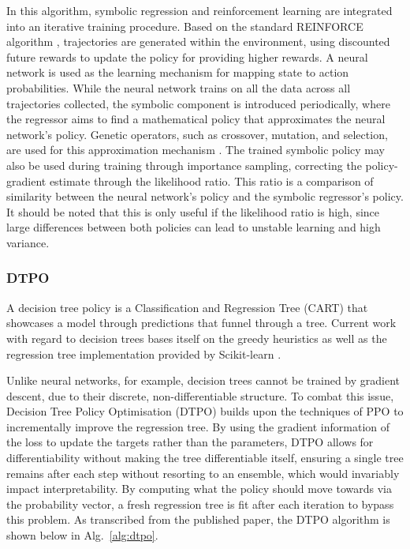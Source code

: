 In this algorithm, symbolic regression and reinforcement learning are integrated into an iterative training procedure. Based on the standard REINFORCE algorithm \cite{williams1992simple}, trajectories are generated within the environment, using discounted future rewards to update the policy for providing higher rewards. A neural network is used as the learning mechanism for mapping state to action probabilities. While the neural network trains on all the data across all trajectories collected, the symbolic component is introduced periodically, where the regressor aims to find a mathematical policy that approximates the neural network's policy. Genetic operators, such as crossover, mutation, and selection, are used for this approximation mechanism \cite{dutta2023s}. The trained symbolic policy may also be used during training through importance sampling, correcting the policy-gradient estimate through the likelihood ratio. This ratio is a comparison of similarity between the neural network's policy and the symbolic regressor's policy. It should be noted that this is only useful if the likelihood ratio is high, since large differences between both policies can lead to unstable learning and high variance.

\subsubsection{DTPO}

A decision tree policy is a Classification and Regression Tree (CART) that showcases a model through predictions that funnel through a tree. Current work with regard to decision trees bases itself on the greedy heuristics \cite{breiman1984classification} as well as the regression tree implementation provided by Scikit-learn \cite{pedregosa2011scikit}.

Unlike neural networks, for example, decision trees cannot be trained by gradient descent, due to their discrete, non-differentiable structure. To combat this issue, Decision Tree Policy Optimisation (DTPO) \cite{vos2024optimizing} builds upon the techniques of PPO to incrementally improve the regression tree. By using the gradient information of the loss to update the targets rather than the parameters, DTPO allows for differentiability without making the tree differentiable itself, ensuring a single tree remains after each step without resorting to an ensemble, which would invariably impact interpretability. By computing what the policy should move towards via the probability vector, a fresh regression tree is fit after each iteration to bypass this problem. As transcribed from the published paper, the DTPO algorithm is shown below in Alg.~\ref{alg:dtpo}.


